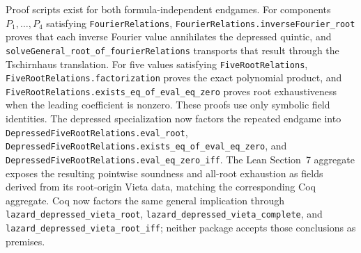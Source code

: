 \documentclass[11pt,a4paper,oneside]{article}
\newcommand{\lean}[1]{\nolinkurl{#1}}
\begin{document}
Proof scripts exist for both formula-independent endgames.  For components
$P_1,\ldots,P_4$ satisfying \lean{FourierRelations},
\lean{FourierRelations.inverseFourier_root} proves that each inverse Fourier
value annihilates the depressed quintic, and
\lean{solveGeneral_root_of_fourierRelations} transports that result through
the Tschirnhaus translation.  For five values satisfying
\lean{FiveRootRelations}, \lean{FiveRootRelations.factorization} proves the
exact polynomial product, and
\lean{FiveRootRelations.exists_eq_of_eval_eq_zero} proves root exhaustiveness
when the leading coefficient is nonzero.  These proofs use only symbolic field
identities.  The depressed specialization now factors the repeated endgame
into \lean{DepressedFiveRootRelations.eval_root},
\lean{DepressedFiveRootRelations.exists_eq_of_eval_eq_zero}, and
\lean{DepressedFiveRootRelations.eval_eq_zero_iff}.  The Lean Section~7
aggregate exposes the resulting pointwise soundness and all-root exhaustion
as fields derived from its root-origin Vieta data, matching the corresponding
Coq aggregate.  Coq now factors the same general implication through
\lean{lazard_depressed_vieta_root},
\lean{lazard_depressed_vieta_complete}, and
\lean{lazard_depressed_vieta_root_iff}; neither package accepts those
conclusions as premises.
\end{document}

